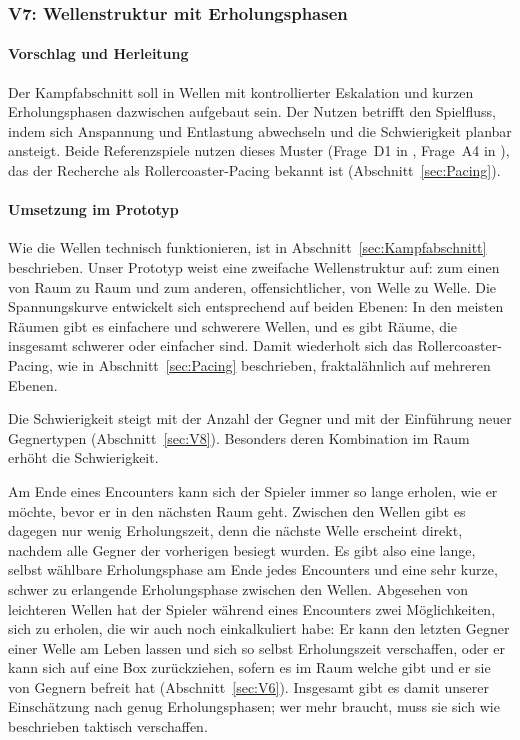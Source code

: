 \documentclass[../Main.tex]{subfiles}
\begin{document}
\subsubsection{V7: Wellenstruktur mit Erholungsphasen} \label{sec:V7}

\paragraph{Vorschlag und Herleitung}
Der Kampfabschnitt soll in Wellen mit kontrollierter Eskalation und kurzen Erholungsphasen dazwischen aufgebaut sein. Der Nutzen betrifft den Spielfluss, indem sich Anspannung und Entlastung abwechseln und die Schwierigkeit planbar ansteigt. Beide Referenzspiele nutzen dieses Muster (Frage~D1 in , Frage~A4 in ), das der Recherche als Rollercoaster-Pacing bekannt ist (Abschnitt~\ref{sec:Pacing}).

\paragraph{Umsetzung im Prototyp}
Wie die Wellen technisch funktionieren, ist in Abschnitt~\ref{sec:Kampfabschnitt} beschrieben. Unser Prototyp weist eine zweifache Wellenstruktur auf: zum einen von Raum zu Raum und zum anderen, offensichtlicher, von Welle zu Welle. Die Spannungskurve entwickelt sich entsprechend auf beiden Ebenen: In den meisten Räumen gibt es einfachere und schwerere Wellen, und es gibt Räume, die insgesamt schwerer oder einfacher sind. Damit wiederholt sich das Rollercoaster-Pacing, wie in Abschnitt~\ref{sec:Pacing} beschrieben, fraktalähnlich auf mehreren Ebenen.

Die Schwierigkeit steigt mit der Anzahl der Gegner und mit der Einführung neuer Gegnertypen (Abschnitt~\ref{sec:V8}). Besonders deren Kombination im Raum erhöht die Schwierigkeit.

Am Ende eines Encounters kann sich der Spieler immer so lange erholen, wie er möchte, bevor er in den nächsten Raum geht. Zwischen den Wellen gibt es dagegen nur wenig Erholungszeit, denn die nächste Welle erscheint direkt, nachdem alle Gegner der vorherigen besiegt wurden. Es gibt also eine lange, selbst wählbare Erholungsphase am Ende jedes Encounters und eine sehr kurze, schwer zu erlangende Erholungsphase zwischen den Wellen. Abgesehen von leichteren Wellen hat der Spieler während eines Encounters zwei Möglichkeiten, sich zu erholen, die wir auch noch einkalkuliert habe: Er kann den letzten Gegner einer Welle am Leben lassen und sich so selbst Erholungszeit verschaffen, oder er kann sich auf eine Box zurückziehen, sofern es im Raum welche gibt und er sie von Gegnern befreit hat (Abschnitt~\ref{sec:V6}). Insgesamt gibt es damit unserer Einschätzung nach genug Erholungsphasen; wer mehr braucht, muss sie sich wie beschrieben taktisch verschaffen.
\end{document}
